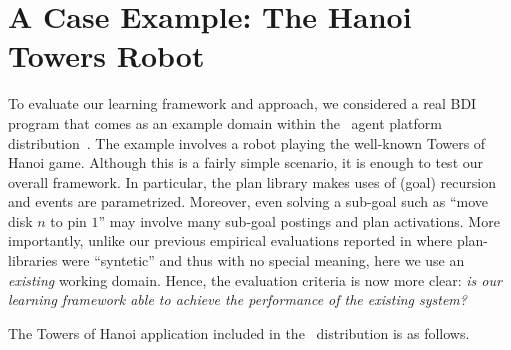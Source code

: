 \section{A Case Example: The Hanoi Towers Robot}\label{sec:hanoi}

\newcommand{\entity}[1]{\texttt{#1}}

To evaluate our learning framework and approach, we considered a real BDI program
that comes as an example domain within the \JACK\ agent platform
distribution~\cite{BusettaRHL:AL99-JACK}.
The example involves a robot playing the well-known Towers of Hanoi game.
Although this is a fairly simple scenario, it is enough to test our overall
framework. In particular, the plan library makes uses of (goal) recursion and
events are parametrized. Moreover, even solving a sub-goal such as ``move disk
$n$ to pin $1$'' may involve many sub-goal postings and plan activations.
More importantly, unlike our previous empirical evaluations reported in
\cite{Airiau:IJAT:09,Singh:AAMAS10} where plan-libraries were ``syntetic'' and
thus with no special meaning, here we use an \emph{existing} working domain.
Hence, the evaluation criteria is now more clear: \emph{is our learning framework
able to achieve the performance of the existing system?}


The Towers of Hanoi application included in the \JACK\ distribution is as
follows.



